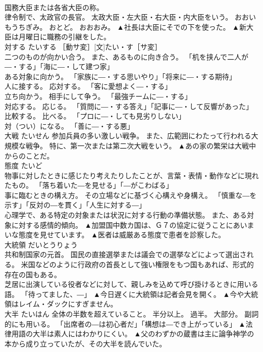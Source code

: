 \documentclass[8pt]{extreport}
\begin{document}
\begin{CJK}{UTF8}{min}
\\	国務大臣または各省大臣の称。 
\\	律令制で、太政官の長官。 太政大臣・左大臣・右大臣・内大臣をいう。 おおいもうちぎみ。 おとど。 おおおみ。	▲社長は大臣にそでの下を使った。 ▲新大臣は月曜日に職務の引継をした。
\\	対する	たいする	［動サ変］[文]たい・す［サ変］ 
\\	二つのものが向かい合う。 また、あるものに向き合う。 「机を挟んで二人が―・する」「海に―・して建つ家」 
\\	ある対象に向かう。 「家族に―・する思いやり」「将来に―・する期待」 
\\	人に接する。 応対する。 「客に愛想よく―・する」 
\\	立ち向かう。 相手にして争う。 「最強チームに―・する」 
\\	対応する。 応じる。 「質問に―・する答え」「記事に―・して反響があった」 
\\	比較する。 比べる。 「プロに―・しても見劣りしない」 
\\	対（つい）になる。 「善に―・する悪」	
\\	大戦	たいせん	参加兵員の多い激しい戦争。 また、広範囲にわたって行われる大規模な戦争。 特に、第一次または第二次大戦をいう。	▲あの家の繁栄は大戦中からのことだ。
\\	態度	たいど	
\\	物事に対したときに感じたり考えたりしたことが、言葉・表情・動作などに現れたもの。 「落ち着いた―を見せる」「―がこわばる」 
\\	事に臨むときの構え方。 その立場などに基づく心構えや身構え。 「慎重な―を示す」「反対の―を貫く」「人生に対する―」 
\\	心理学で、ある特定の対象または状況に対する行動の準備状態。 また、ある対象に対する感情的傾向。	▲加盟国中数カ国は、Ｇ７の協定に従うことにあいまいな態度を見せています。 ▲医者は威厳ある態度で患者を診察した。
\\	大統領	だいとうりょう	
\\	共和制国家の元首。 国民の直接選挙または議会での選挙などによって選出される。 米国などのように行政府の首長として強い権限をもつ国もあれば、形式的存在の国もある。 
\\	芝居に出演している役者などに対して、親しみを込めて呼び掛けるときに用いる語。 「待ってました、―」	▲今日遅くに大統領は記者会見を開く。 ▲今や大統領はレイム・ダックにすぎません。
\\	大半	たいはん	全体の半数を超えていること。 半分以上。 過半。 大部分。 副詞的にも用いる。 「出席者の―は初心者だ」「構想は―でき上がっている」	▲法律用語の大半は素人にはわかりにくい。 ▲父のわずかの蔵書は主に論争神学の本から成り立っていたが、その大半を読んでいた。

\end{CJK}
\end{document}

